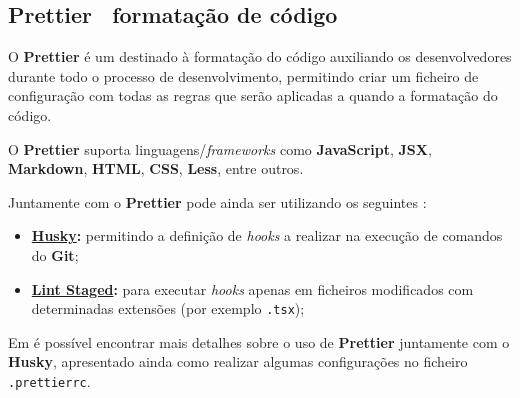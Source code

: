 \subsection{\textbf{Prettier} \textemdash~formatação de código}

\begin{minipage}{.3\textwidth}
\end{minipage}
\begin{minipage}{.7\textwidth}
	\minipagerestore
	O \textbf{Prettier} é um  destinado à formatação do código auxiliando os desenvolvedores durante todo o processo de desenvolvimento, permitindo criar um ficheiro de configuração com todas as regras que serão aplicadas a quando a formatação do código.

	O \textbf{Prettier} suporta linguagens/\textit{frameworks} como \textbf{JavaScript}, \textbf{JSX}, \textbf{Markdown}, \textbf{HTML}, \textbf{CSS}, \textbf{Less}, entre outros.

\end{minipage}

Juntamente com o \textbf{Prettier} pode ainda ser utilizando os seguintes :
\begin{itemize}
	\item \textbf{\href{https://github.com/typicode/husky}{Husky}:} permitindo a definição de \textit{hooks} a realizar na execução de comandos do \textbf{Git};
	\item \textbf{\href{https://github.com/okonet/lint-staged}{Lint Staged}:} para executar \textit{hooks} apenas em ficheiros modificados com determinadas extensões (por exemplo \verb|.tsx|);
\end{itemize}

Em  é possível encontrar mais detalhes sobre o uso de \textbf{Prettier} juntamente com o \textbf{Husky}, apresentado ainda como realizar algumas configurações no ficheiro \verb|.prettierrc|.